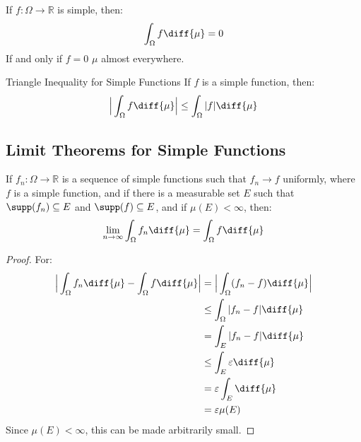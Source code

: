         \begin{theorem}
            If $f:\Omega\rightarrow\mathbb{R}$ is simple, then:
            \begin{equation}
                \int_{\Omega}f\diff{\mu}=0
            \end{equation}
            If and only if $f=0$ $\mu$ almost everywhere.
        \end{theorem}
        \begin{ftheorem}{Triangle Inequality for Simple Functions}{}
            If $f$ is a simple function, then:
            \begin{equation}
                \Big|\int_{\Omega}f\diff{\mu}\Big|\leq\int_{\Omega}|f|\diff{\mu}
            \end{equation}
        \end{ftheorem}
    \subsection{Limit Theorems for Simple Functions}
        \begin{theorem}
            If $f_{n}:\Omega\rightarrow\mathbb{R}$ is a sequence of simple
            functions such that $f_{n}\rightarrow{f}$ uniformly, where $f$ is a
            simple function, and if there is a measurable set $E$ such that
            $\supp(f_{n})\subseteq{E}$ and $\supp(f)\subseteq{E}$, and if
            $\mu(E)<\infty$, then:
            \begin{equation}
                \underset{n\rightarrow\infty}{\lim}\int_{\Omega}f_{n}\diff{\mu}
                    =\int_{\Omega}f\diff{\mu}
            \end{equation}
        \end{theorem}
        \begin{proof}
            For:
            \begin{align}
                \Big|\int_{\Omega}f_{n}\diff{\mu}-\int_{\Omega}f\diff{\mu}\Big|
                &=\Big|\int_{\Omega}(f_{n}-f)\diff{\mu}\Big|\\
                &\leq\int_{\Omega}|f_{n}-f|\diff{\mu}\\
                &=\int_{E}|f_{n}-f|\diff{\mu}\\
                &\leq\int_{E}\varepsilon\diff{\mu}\\
                &=\varepsilon\int_{E}\diff{\mu}\\
                &=\varepsilon\mu(E)
            \end{align}
            Since $\mu(E)<\infty$, this can be made arbitrarily small.
        \end{proof}
